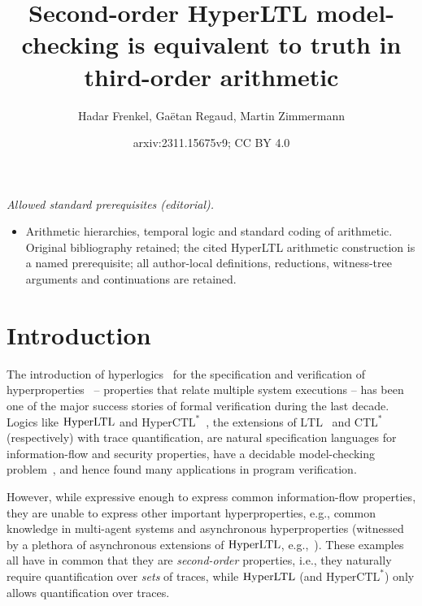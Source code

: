 \documentclass[dvipsnames,10pt,a4paper]{amsart}
\title{Second-order HyperLTL model-checking is equivalent to truth in third-order arithmetic}
\author{Hadar Frenkel, Gaëtan Regaud, Martin Zimmermann}
\date{arxiv:2311.15675v9; CC BY 4.0}
\theoremstyle{definition}
\theoremstyle{remark}
\newcommand{\ltl}{\mathrm{LTL}\xspace}
\newcommand{\ctlstar}{\mathrm{CTL^*}\xspace}
\newcommand{\hyltl}{\mathrm{Hyper\-LTL}\xspace}
\newcommand{\hyctlstar}{\mathrm{HyperCTL^*}\xspace}
\begin{document}
\maketitle
\noindent\textit{Allowed standard prerequisites (editorial).}\begin{itemize}
\item Arithmetic hierarchies, temporal logic and standard coding of arithmetic. Original bibliography retained; the cited HyperLTL arithmetic construction is a named prerequisite; all author-local definitions, reductions, witness-tree arguments and continuations are retained.
\end{itemize}\medskip

\section{Introduction}
\label{sec:intro}

The introduction of hyperlogics~\cite{ClarksonFKMRS14} for the specification and verification of hyperproperties~\cite{ClarksonS10} -- properties that relate multiple system executions -- has been one of the major success stories of formal verification during the last decade.
Logics like $\hyltl$ and $\hyctlstar$~\cite{ClarksonFKMRS14}, the extensions of $\ltl$~\cite{Pnueli77} 
and $\ctlstar$~\cite{EmersonH86} (respectively) with trace quantification, are natural specification languages for information-flow and security properties, have a decidable model-checking problem~\cite{FinkbeinerRS15}, and hence found many applications in program verification.

However, while expressive enough to express common information-flow properties, they are unable to express other important hyperproperties, e.g., common knowledge in multi-agent systems and asynchronous hyperproperties (witnessed by a plethora of asynchronous extensions of $\hyltl$, e.g.,~\cite{BartocciHNC23,DBLP:conf/cav/BaumeisterCBFS21,BeutnerF23,DBLP:journals/corr/abs-2404-16778,DBLP:conf/lics/BozzelliPS21,DBLP:conf/concur/BozzelliPS22,DBLP:journals/pacmpl/GutsfeldMO21,DBLP:conf/mfcs/KontinenSV23,KontinenSV24,DBLP:conf/mfcs/KrebsMV018}).
These examples all have in common that they are \emph{second-order} properties, i.e., they naturally require quantification over \emph{sets} of traces, while $\hyltl$ (and $\hyctlstar$) only allows quantification over traces.
\end{document}
